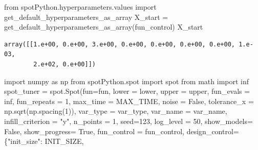 \documentclass[
  letterpaper,
  DIV=11,
  numbers=noendperiod]{scrreprt}
\newenvironment{Shaded}{\begin{snugshade}}{\end{snugshade}}
\newcommand{\DecValTok}[1]{\textcolor[rgb]{0.68,0.00,0.00}{#1}}
\newcommand{\ImportTok}[1]{\textcolor[rgb]{0.00,0.46,0.62}{#1}}
\newcommand{\NormalTok}[1]{\textcolor[rgb]{0.00,0.23,0.31}{#1}}
\newcommand{\OperatorTok}[1]{\textcolor[rgb]{0.37,0.37,0.37}{#1}}
\newcommand{\StringTok}[1]{\textcolor[rgb]{0.13,0.47,0.30}{#1}}
\newcommand{\VariableTok}[1]{\textcolor[rgb]{0.07,0.07,0.07}{#1}}
\begin{document}
\begin{Shaded}
\begin{Highlighting}[]
\ImportTok{from}\NormalTok{ spotPython.hyperparameters.values }\ImportTok{import}\NormalTok{ get\_default\_hyperparameters\_as\_array}
\NormalTok{X\_start }\OperatorTok{=}\NormalTok{ get\_default\_hyperparameters\_as\_array(fun\_control)}
\NormalTok{X\_start}
\end{Highlighting}
\end{Shaded}

\begin{verbatim}
array([[1.e+00, 0.e+00, 3.e+00, 0.e+00, 0.e+00, 0.e+00, 0.e+00, 1.e-03,
        2.e+02, 0.e+00]])
\end{verbatim}

\begin{Shaded}
\begin{Highlighting}[]
\ImportTok{import}\NormalTok{ numpy }\ImportTok{as}\NormalTok{ np}
\ImportTok{from}\NormalTok{ spotPython.spot }\ImportTok{import}\NormalTok{ spot}
\ImportTok{from}\NormalTok{ math }\ImportTok{import}\NormalTok{ inf}
\NormalTok{spot\_tuner }\OperatorTok{=}\NormalTok{ spot.Spot(fun}\OperatorTok{=}\NormalTok{fun,}
\NormalTok{                   lower }\OperatorTok{=}\NormalTok{ lower,}
\NormalTok{                   upper }\OperatorTok{=}\NormalTok{ upper,}
\NormalTok{                   fun\_evals }\OperatorTok{=}\NormalTok{ inf,}
\NormalTok{                   fun\_repeats }\OperatorTok{=} \DecValTok{1}\NormalTok{,}
\NormalTok{                   max\_time }\OperatorTok{=}\NormalTok{ MAX\_TIME,}
\NormalTok{                   noise }\OperatorTok{=} \VariableTok{False}\NormalTok{,}
\NormalTok{                   tolerance\_x }\OperatorTok{=}\NormalTok{ np.sqrt(np.spacing(}\DecValTok{1}\NormalTok{)),}
\NormalTok{                   var\_type }\OperatorTok{=}\NormalTok{ var\_type,}
\NormalTok{                   var\_name }\OperatorTok{=}\NormalTok{ var\_name,}
\NormalTok{                   infill\_criterion }\OperatorTok{=} \StringTok{"y"}\NormalTok{,}
\NormalTok{                   n\_points }\OperatorTok{=} \DecValTok{1}\NormalTok{,}
\NormalTok{                   seed}\OperatorTok{=}\DecValTok{123}\NormalTok{,}
\NormalTok{                   log\_level }\OperatorTok{=} \DecValTok{50}\NormalTok{,}
\NormalTok{                   show\_models}\OperatorTok{=} \VariableTok{False}\NormalTok{,}
\NormalTok{                   show\_progress}\OperatorTok{=} \VariableTok{True}\NormalTok{,}
\NormalTok{                   fun\_control }\OperatorTok{=}\NormalTok{ fun\_control,}
\NormalTok{                   design\_control}\OperatorTok{=}\NormalTok{\{}\StringTok{"init\_size"}\NormalTok{: INIT\_SIZE,}

\end{Highlighting}
\end{Shaded}
\end{document}
